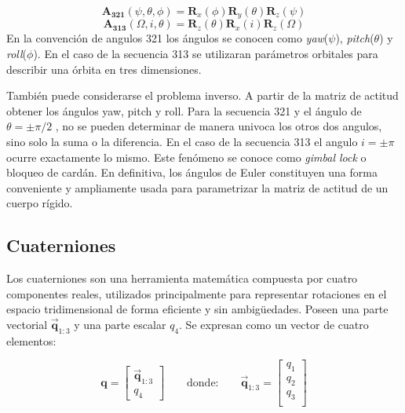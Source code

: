 \begin{equation}
		\mathbf{A_{321}}(\psi,\theta,\phi) = \mathbf{R}_x(\phi) \mathbf{R}_y(\theta) \mathbf{R}_z(\psi)
\end{equation}
\begin{equation} %
		\mathbf{A_{313}}(\Omega,i,\theta) = \mathbf{R}_z(\theta) \mathbf{R}_x(i) \mathbf{R}_z(\Omega)
\end{equation}
En la convención de angulos 321 los ángulos se conocen como \textit{yaw}($\psi$), \textit{pitch}($\theta$) y \textit{roll}($\phi$). En el caso de la secuencia 313 se utilizaran parámetros orbitales para describir una órbita en tres dimensiones. 

También puede considerarse el problema inverso. A partir de la matriz de actitud obtener los ángulos yaw, pitch y roll. Para la secuencia 321 y el ángulo de $\theta =\pm \pi/2$ , no se pueden determinar de manera univoca los otros dos angulos, sino solo la suma o la diferencia. En el caso de la secuencia 313 el angulo $i = \pm \pi$ ocurre exactamente lo mismo. Este fenómeno se conoce como \textit{gimbal lock} o bloqueo de cardán. En definitiva, los ángulos de Euler constituyen una forma conveniente y ampliamente usada para parametrizar la matriz de actitud de un cuerpo rígido.


\subsection{Cuaterniones}

Los cuaterniones son una herramienta matemática compuesta por cuatro componentes reales, utilizados principalmente para representar rotaciones en el espacio tridimensional de forma eficiente y sin ambigüedades. Poseen una parte vectorial $\vec{\mathbf{q}}_{1:3}$ y una parte escalar $q_4$. Se expresan como un vector de cuatro elementos:

\begin{equation}
	\mathbf{q} = \begin{bmatrix}
		\vec{\mathbf{q}}_{1:3} \\ 
		q_4
	\end{bmatrix}
	\qquad \text{donde:}
	\qquad
	\vec{\mathbf{q}}_{1:3} =  
	\begin{bmatrix}
		q_1 \\
		q_2 \\ 
		q_3 \\
	\end{bmatrix}
\end{equation}


